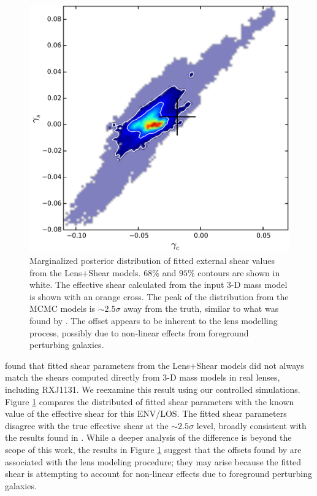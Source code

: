 \documentclass{emulateapj}
\begin{document}
\begin{figure}[ht]
\centering
\includegraphics[width=\columnwidth]{shear_offset.pdf}
\caption{Marginalized posterior distribution of fitted external shear values from the Lens+Shear models. $68\%$ and $95\%$ contours are shown in white. The effective shear calculated from the input 3-D mass model is shown with an orange cross. The peak of the distribution from the MCMC models is $\sim 2.5 \sigma$ away from the truth, similar to what was found by \citet{Wong11}. The offset appears to be inherent to the lens modelling process, possibly due to non-linear effects from foreground perturbing galaxies.}
\label{fig:shear_compare}
\end{figure}

\citet{Wong11} found that fitted shear parameters from the Lens+Shear models did not always match the shears computed directly from 3-D mass models in real lenses, including RXJ1131. We reexamine this result using our controlled simulations. Figure \ref{fig:shear_compare} compares the distributed of fitted shear parameters with the known value of the effective shear for this ENV/LOS. The fitted shear parameters disagree with the true effective shear at the $\sim 2.5\sigma$ level, broadly consistent with the results found in \citet{Wong11}. While a deeper analysis of the difference is beyond the scope of this work, the results in Figure \ref{fig:shear_compare} suggest that the offsets found by \citet{Wong11} are associated with the lens modeling procedure; they may arise because the fitted shear is attempting to account for non-linear effects due to foreground perturbing galaxies.
\end{document}
